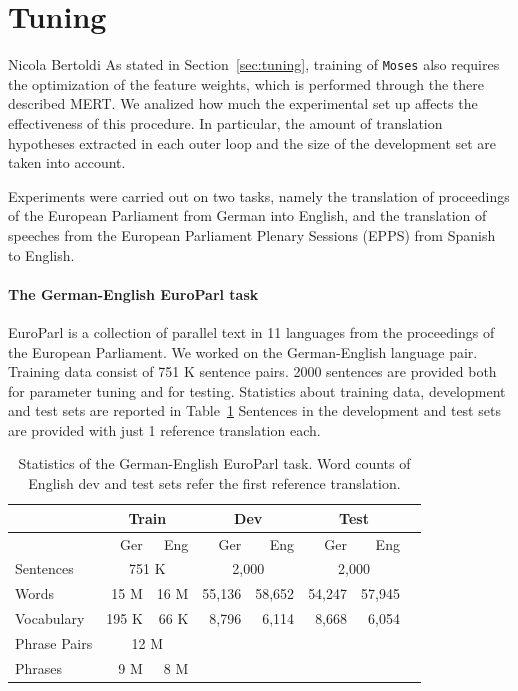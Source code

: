 \documentclass[11pt]{report}
\theoremstyle{plain}
\begin{document}
{\section{Tuning}
{\sc Nicola Bertoldi}
\label{sec:exp-tuning}
As stated in Section~\ref{sec:tuning}, training of {\tt Moses} also requires the optimization of the feature weights, which is performed through the there described MERT. We analized how much the experimental set up affects the effectiveness of this procedure. In particular, the amount of translation hypotheses extracted in each outer loop and the size of the development set are taken into account.

Experiments were carried out on two tasks, namely the translation of proceedings of 
the European Parliament from German into English, and the translation  of  speeches from the  European Parliament Plenary Sessions (EPPS) from Spanish to English.

\paragraph{The German-English EuroParl task}
\label{sec:ge-en-europarl-task}
EuroParl \cite{koehn:europarl:mtsummit:2005} is a collection of parallel text in 11 languages from the proceedings of the European Parliament. We worked on the German-English language pair. Training data consist of 751 K sentence pairs. 2000 sentences are provided both for parameter tuning and for testing.  Statistics about training data, development and test sets are reported in Table~\ref{tbl:ge-en-europarl-data}
Sentences in the development and test sets are provided with just 1 reference translation each.  

\begin{table}[th]
\begin{center}
\begin{tabular}{lrr|rr|rrr}
        &  \multicolumn{2}{c|}{Train}   &  \multicolumn{2}{c|}{Dev}    &  \multicolumn{2}{c}{Test}\\
 \hline
        &  Ger   &   Eng  &  Ger   &   Eng  &  Ger   &   Eng     \\
 \hline
Sentences    & \multicolumn{2}{c|}{751 K} & \multicolumn{2}{c|}{2,000} & \multicolumn{2}{c}{2,000}\\
Words & 15 M & 16 M & 55,136 & 58,652 & 54,247 & 57,945\\
Vocabulary  & 195 K & 66 K & 8,796 & 6,114& 8,668 & 6,054&\\
Phrase Pairs  & \multicolumn{2}{c|}{12 M}\\
Phrases & 9 M & 8 M \\
\end{tabular}
\caption{Statistics of the German-English EuroParl task. Word counts of  English dev and test sets refer
 the first reference translation. }
\begin{center}
\end{center}
\label{tbl:ge-en-europarl-data}
\end{center}
\end{table}

}
\end{document}
